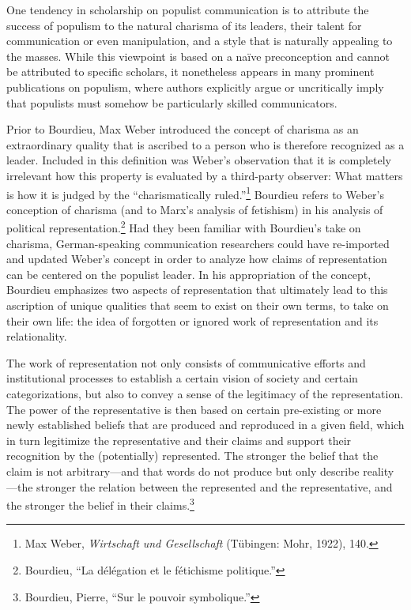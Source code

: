 \documentclass{tufte-handout}
\begin{document}
One tendency in scholarship on populist communication is to attribute
the success of populism to the natural charisma of its leaders, their
talent for communication or even manipulation, and a style that is
naturally appealing to the masses. While this viewpoint is based on a
naïve preconception and cannot be attributed to specific scholars, it
nonetheless appears in many prominent publications on populism, where
authors explicitly argue or uncritically imply that populists must
somehow be particularly skilled communicators.

Prior to Bourdieu, Max Weber introduced the concept of charisma as an
extraordinary quality that is ascribed to a person who is therefore
recognized as a leader. Included in this definition was Weber's
observation that it is completely irrelevant how this property is
evaluated by a third-party observer: What matters is how it is judged by
the ``charismatically ruled.''\footnote{Max Weber, \emph{Wirtschaft und
  Gesellschaft} (Tübingen: Mohr, 1922), 140.} Bourdieu refers to Weber's
conception of charisma (and to Marx's analysis of fetishism) in his
analysis of political representation.\footnote{Bourdieu, ``La délégation
  et le fétichisme politique.''} Had they been familiar with Bourdieu's
take on charisma, German-speaking communication researchers could have
re-imported and updated Weber's concept in order to analyze how claims
of representation can be centered on the populist leader. In his
appropriation of the concept, Bourdieu emphasizes two aspects of
representation that ultimately lead to this ascription of unique
qualities that seem to exist on their own terms, to take on their own
life: the idea of forgotten or ignored work of representation and its
relationality.

The work of representation not only consists of communicative efforts
and institutional processes to establish a certain vision of society and
certain categorizations, but also to convey a sense of the legitimacy of
the representation. The power of the representative is then based on
certain pre-existing or more newly established beliefs that are produced
and reproduced in a given field, which in turn legitimize the
representative and their claims and support their recognition by the
(potentially) represented. The stronger the belief that the claim is not
arbitrary---and that words do not produce but only describe
reality---the stronger the relation between the represented and the
representative, and the stronger the belief in their claims.\footnote{Bourdieu,
  Pierre, ``Sur le pouvoir symbolique.''}
\end{document}
